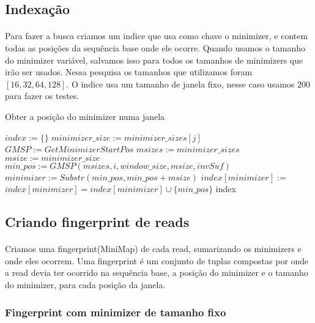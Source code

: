 \documentclass{article}
\begin{document}
\subsection{Indexação}
\paragraph{}{Para fazer a busca criamos um indice que usa como chave o minimizer, e contem todas as posições da sequência base onde ele ocorre. Quando usamos o tamanho do minimizer variável, salvamos isso para todos os tamanhos de minimizers que irão ser usados. Nessa pesquisa os tamanhos que utilizamos foram \([16, 32, 64, 128]\). O indice usa um tamanho de janela fixo, nesse caso usamos 200 para fazer os testes.}
\begin{algorithm}[H]
  \caption{Obter a posição do minimizer numa janela}
  \begin{algorithmic}[1]
      \State $index := \{\}$
        \State $minimizer\_size := minimizer\_sizes[j]$
          \State $GMSP := GetMinimizerStartPos$
          \State $msizes := minimizer\_sizes$
          \State $msize := minimizer\_size$
          \State $min\_pos := GMSP(msizes, i, window\_size, msize, invSuf)$
          \State $minimizer := Substr(min\_pos, min\_pos + msize)$
            \State $index[minimizer] := {}$
          \EndIf
          \State $index[minimizer] = index[minimizer] \cup \{min\_pos\}$
        \EndFor
      \EndFor
      \State \Return index
    \EndFunction
  \end{algorithmic}
\end{algorithm} 
\subsection{Criando fingerprint de reads}
\paragraph{}{Criamos uma fingerprint(MiniMap) de cada read, sumarizando os minimizers e onde eles ocorrem. Uma fingerprint é um conjunto de tuplas compostas por onde a read devia ter ocorrido na sequência base, a posição do minimizer e o tamanho do minimizer, para cada posição da janela.  }
\subsubsection{Fingerprint com minimizer de tamanho fixo}
\end{document}
